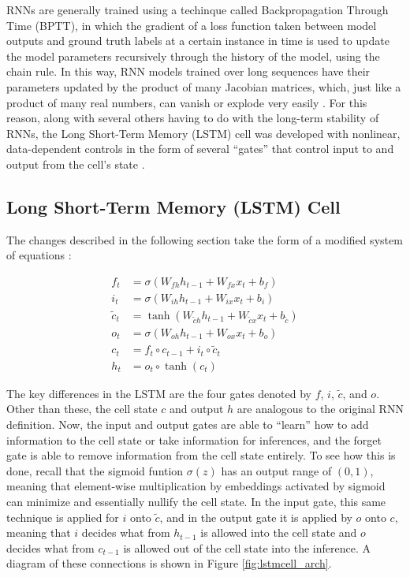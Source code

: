 \documentclass{scrartcl}
\begin{document}
RNNs are generally trained using a techinque called Backpropagation Through
Time (BPTT), in which the gradient of a loss function taken between model
outputs and ground truth labels at a certain instance in time is used to update
the model parameters recursively through the history of the model, using the
chain rule. In this way, RNN models trained over long sequences have their
parameters updated by the product of many Jacobian matrices, which, just like a
product of many real numbers, can vanish or explode very easily
\cite{rnn_training_challenges}. For this reason, along with several others
having to do with the long-term stability of RNNs, the Long Short-Term Memory
(LSTM) cell was developed with nonlinear, data-dependent controls in the form
of several ``gates'' that control input to and output from the cell's state
\cite{rnn_and_lstm_fundamentals}.

\subsection{Long Short-Term Memory (LSTM) Cell}
\label{subsec:lstm}

The changes described in the following section take the form of a modified
system of equations \cite{rnn_review}: 

\newcommand{\csquig}{\tilde{c}}

\begin{equation}
	\begin{split}
		f_t           & = \sigma ( W_{fh} h_{t - 1} + W_{fx} x_t + b_f ) \\
		i_t           & = \sigma ( W_{ih} h_{t - 1} + W_{ix} x_t + b_i ) \\
		\csquig_t     & = \tanh ( W_{\csquig h} h_{t - 1} + W_{\csquig x} x_t + b_{\csquig} ) \\
		o_t           & = \sigma ( W_{oh} h_{t - 1} + W_{ox} x_t + b_o ) \\
		c_t           & = f_t \circ c_{t - 1} + i_t \circ \tilde{c}_t \\
		h_t           & = o_t \circ \tanh ( c_t )
	\end{split}
	\label{eq:lstm_canonical}
\end{equation}

The key differences in the LSTM are the four gates denoted by $f$, $i$,
$\tilde{c}$, and $o$. Other than these, the cell state $c$ and output $h$ are
analogous to the original RNN definition. Now, the input and output gates are
able to ``learn'' how to add information to the cell state or take information
for inferences, and the forget gate is able to remove information from the cell
state entirely. To see how this is done, recall that the sigmoid funtion
$\sigma (z)$ has an output range of $(0, 1)$, meaning that element-wise
multiplication by embeddings activated by sigmoid can minimize and essentially
nullify the cell state. In the input gate, this same technique is applied for
$i$ onto $\tilde{c}$, and in the output gate it is applied by $o$ onto $c$,
meaning that $i$ decides what from $h_{t - 1}$ is allowed into the cell state
and $o$ decides what from $c_{t - 1}$ is allowed out of the cell state into the
inference. A diagram of these connections is shown in Figure
\ref{fig:lstmcell_arch}.
\end{document}
